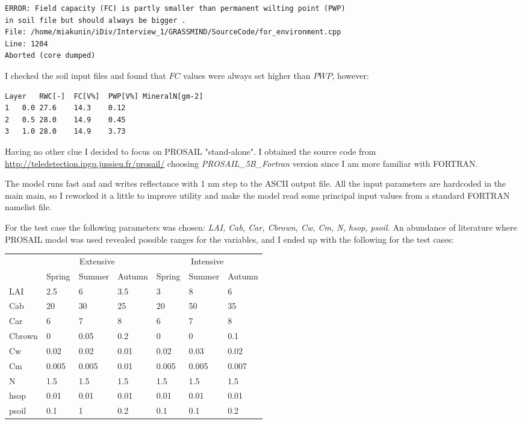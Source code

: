 \documentclass[a4paper,12pt]{article}
\begin{document}
\begin{verbatim}
ERROR: Field capacity (FC) is partly smaller than permanent wilting point (PWP) 
in soil file but should always be bigger . 
File: /home/miakunin/iDiv/Interview_1/GRASSMIND/SourceCode/for_environment.cpp  
Line: 1204
Aborted (core dumped)
\end{verbatim}

I checked the soil input files and found that $FC$ values were always set higher than $PWP$, however:
\begin{verbatim}
Layer	RWC[-]	FC[V%]	PWP[V%]	MineralN[gm-2]		
1	0.0	27.6	14.3	0.12
2	0.5	28.0	14.9	0.45
3	1.0	28.0	14.9	3.73  
\end{verbatim}

Having no other clue I decided to focus on PROSAIL "stand-alone". I obtained the source code from \url{http://teledetection.ipgp.jussieu.fr/prosail/} choosing \textit{PROSAIL\_5B\_Fortran} version since I am more familiar with FORTRAN.

The model runs fast and and writes reflectance with 1 nm step to the ASCII output file. All the input parameters are hardcoded in the main main, so I reworked it a little to improve utility and make the model read some principal input values from a standard FORTRAN namelist file.

For the test case the following parameters was chosen: \textit{LAI, Cab, Car, Cbrown, Cw, Cm, N, hsop, psoil.} An abundance of literature where PROSAIL model was used revealed possible ranges for the variables, and I ended up with the following for the test cases:

\begin{center}
\begin{tabular}{ l | l l l | l l l }
~	&  \multicolumn{3}{|c|}{Extensive} & \multicolumn{3}{|c}{Intensive}		\\
~	&Spring	&Summer	&Autumn	&Spring	&Summer	&Autumn \\
\hline
LAI	&2.5 	&6	&3.5 	& 3	&8	&6 \\
Cab	&20	&30&	25	&20	&50	& 35 \\
Car	&6	&7	&8	&6	&7	&8 \\
Cbrown	&0	&0.05	&0.2 &	0	&0	& 0.1\\
Cw	& 0.02	&0.02 &	0.01 &	0.02 &	0.03 &	0.02 \\
Cm	&0.005	& 0.005	&0.01	&0.005	&0.005	&0.007 \\
N	&1.5	 &1.5 &	1.5	& 1.5	& 1.5	& 1.5 \\
hsop &	0.01 &	0.01 &	0.01 &	0.01 &	0.01 &	0.01 \\
psoil &	0.1	&1	&0.2 &	0.1	&0.1 &	0.2 \\
\end{tabular}
\end{center}
\end{document}

